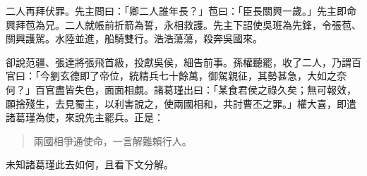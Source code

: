 二人再拜伏罪。先主問曰：「卿二人誰年長？」苞曰：「臣長關興一歲。」先主即命興拜苞為兄。二人就帳前折箭為誓，永相救護。先主下詔使吳班為先鋒，令張苞、關興護駕。水陸並進，船騎雙行。浩浩蕩蕩，殺奔吳國來。

卻說范疆、張達將張飛首級，投獻吳侯，細告前事。孫權聽罷，收了二人，乃謂百官曰：「今劉玄德即了帝位，統精兵七十餘萬，御駕親征，其勢甚急，大如之奈何？」百官盡皆失色，面面相覷。諸葛瑾出曰：「某食君侯之祿久矣；無可報效，願捨殘生，去見蜀主，以利害說之，使兩國相和，共討曹丕之罪。」權大喜，即遣諸葛瑾為使，來說先主罷兵。正是：

\begin{quote}
兩國相爭通使命，一言解難賴行人。
\end{quote}

未知諸葛瑾此去如何，且看下文分解。
